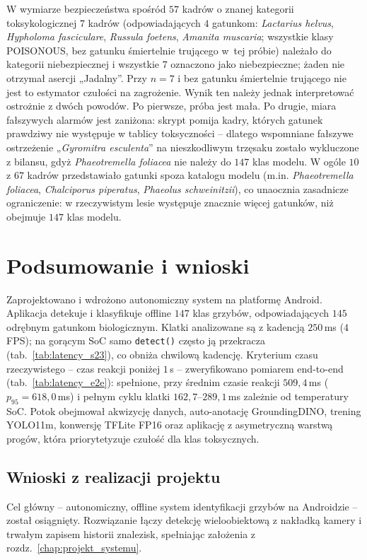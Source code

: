W wymiarze bezpieczeństwa spośród $57$ kadrów o znanej kategorii toksykologicznej $7$ kadrów (odpowiadających $4$ gatunkom: \textit{Lactarius helvus}, \textit{Hypholoma fasciculare}, \textit{Russula foetens}, \textit{Amanita muscaria}; wszystkie klasy POISONOUS, bez gatunku śmiertelnie trującego w~tej próbie) należało do kategorii niebezpiecznej i wszystkie $7$ oznaczono jako niebezpieczne; żaden nie otrzymał asercji „Jadalny”. Przy $n=7$ i bez gatunku śmiertelnie trującego nie jest to estymator czułości na zagrożenie. Wynik ten należy jednak interpretować ostrożnie z dwóch powodów. Po pierwsze, próba jest mała. Po drugie, miara fałszywych alarmów jest zaniżona: skrypt pomija kadry, których gatunek prawdziwy nie występuje w tablicy toksyczności -- dlatego wspomniane fałszywe ostrzeżenie „\textit{Gyromitra esculenta}” na nieszkodliwym trzęsaku zostało wykluczone z bilansu, gdyż \textit{Phaeotremella foliacea} nie należy do $147$ klas modelu. W ogóle $10$ z $67$ kadrów przedstawiało gatunki spoza katalogu modelu (m.in. \textit{Phaeotremella foliacea}, \textit{Chalciporus piperatus}, \textit{Phaeolus schweinitzii}), co unaocznia zasadnicze ograniczenie: w rzeczywistym lesie występuje znacznie więcej gatunków, niż obejmuje $147$ klas modelu.

\chapter{Podsumowanie i wnioski}\label{chap:podsumowanie}
Zaprojektowano i wdrożono autonomiczny system na platformę Android. Aplikacja detekuje i klasyfikuje offline $147$ klas grzybów, odpowiadających $145$ odrębnym gatunkom biologicznym. Klatki analizowane są z kadencją $250$\,ms ($4$\,FPS); na gorącym SoC samo \texttt{detect()} często ją przekracza (tab.~\ref{tab:latency_s23}), co obniża chwilową kadencję. Kryterium czasu rzeczywistego -- czas reakcji poniżej $1$\,s -- zweryfikowano pomiarem end-to-end (tab.~\ref{tab:latency_e2e}): spełnione, przy średnim czasie reakcji $509{,}4$\,ms ($p_{95}=618{,}0$\,ms) i pełnym cyklu klatki $162{,}7$--$289{,}1$\,ms zależnie od temperatury SoC. Potok obejmował akwizycję danych, auto-anotację GroundingDINO, trening YOLO11m, konwersję TFLite FP16 oraz aplikację z asymetryczną warstwą progów, która priorytetyzuje czułość dla klas toksycznych.

\section{Wnioski z realizacji projektu}
Cel główny – autonomiczny, offline system identyfikacji grzybów na Androidzie – został osiągnięty. Rozwiązanie łączy detekcję wieloobiektową z nakładką kamery i trwałym zapisem historii znalezisk, spełniając założenia z rozdz.~\ref{chap:projekt_systemu}.

